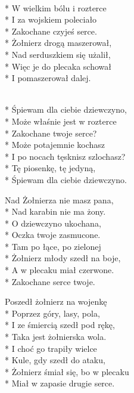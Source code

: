 \begin{lyrics}[longestline={Żołnierz śmiał się, bo w plecaku}]

\\*
W wielkim bólu i rozterce\\*
I za wojskiem poleciało\\*
Zakochane czyjeś serce.\\*
\smallskip
Żołnierz drogą maszerował,\\*
Nad serduszkiem się użalił,\\*
Więc je do plecaka schował\\*
I pomaszerował dalej.

\begin{chorus}
\\*
Śpiewam dla ciebie dziewczyno,\\*
Może właśnie jest w rozterce\\*
Zakochane twoje serce?\\*
\smallskip
Może potajemnie kochasz\\*
I po nocach tęsknisz szlochasz?\\*
Tę piosenkę, tę jedyną,\\*
Śpiewam dla ciebie dziewczyno.
\end{chorus}

Nad Żołnierza nie masz pana,\\*
Nad karabin nie ma żony.\\*
O dziewczyno ukochana,\\*
Oczka twoje zasmucone.\\*
\smallskip
Tam po łące, po zielonej\\*
Żołnierz młody szedł na boje,\\*
A w plecaku miał czerwone.\\*
Zakochane serce twoje.

\chorusref

Poszedł żołnierz na wojenkę\\*
Poprzez góry, lasy, pola,\\*
I ze śmiercią szedł pod rękę,\\*
Taka jest żołnierska wola.\\*
\smallskip
I choć go trapiły wielce\\*
Kule, gdy szedł do ataku,\\*
Żołnierz śmiał się, bo w plecaku\\*
Miał w zapasie drugie serce.

\chorusref
\end{lyrics}



